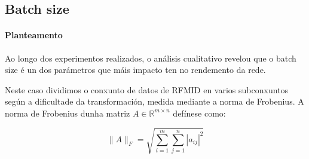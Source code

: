 







\subsection{Batch size}
\label{subsec:Batch size}

\paragraph{Planteamento}
\label{par:Planteamento-batchsize}

Ao longo dos experimentos realizados, o análisis cualitativo revelou que o batch size é un dos parámetros que máis impacto ten no rendemento da rede.

Neste caso dividimos o conxunto de datos de RFMID en varios subconxuntos según a dificultade da transformación, medida mediante a norma de Frobenius.
A norma de Frobenius dunha matriz $A \in \mathbb{R}^{m \times n}$ defínese como:

\[
\|A\|_F = \sqrt{\sum_{i=1}^{m} \sum_{j=1}^{n} |a_{ij}|^2}
\]

